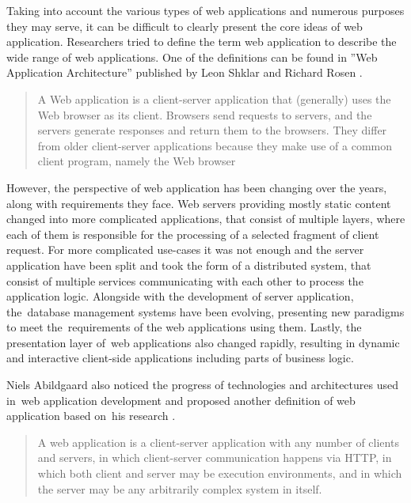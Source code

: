 Taking into account the various types of web applications and numerous purposes they may serve, it can be difficult to clearly present the core ideas of web application. Researchers tried to define the term web application to describe the wide range of web applications. One of the definitions can be found in ''Web Application Architecture'' published by Leon Shklar and Richard Rosen \cite{WebAppArchitecture}.

\begin{quotation}
A Web application is a client-server application that (generally) uses the Web browser as its client. Browsers send requests to servers, and the servers generate responses and return them to the browsers. They differ from older client-server applications because they make use of a common client program, namely the Web browser
\end{quotation}

However, the perspective of web application has been changing over the years, along with requirements they face. Web servers providing mostly static content changed into more complicated applications, that consist of multiple layers, where each of them is responsible for the processing of a selected fragment of client request. For more complicated use-cases it was not enough and the server application have been split and took the form of a distributed system, that consist of multiple services communicating with each other to process the application logic. Alongside with the development of server application, the~database management systems have been evolving, presenting new paradigms to meet the~requirements of the web applications using them. Lastly, the presentation layer of~web applications also changed rapidly, resulting in dynamic and interactive client-side applications including parts of business logic.

Niels Abildgaard also noticed the progress of technologies and architectures used in~web application development and proposed another definition of web application based on~his research \cite{PerspectivesOnArchitectureEvolution}.

\begin{quotation}
A web application is a client-server application with any number of clients and servers, in which client-server communication happens via HTTP, in which both client and server may be execution environments, and in which the server may be any arbitrarily complex system in itself.
\end{quotation}

